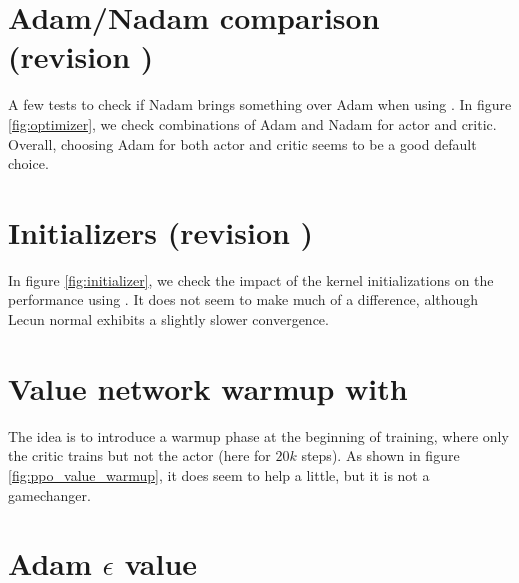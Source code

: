 \section{Adam/Nadam comparison (revision )}

A few tests to check if Nadam brings something over Adam when using \ppo. In figure \ref{fig:optimizer}, we check combinations of Adam and Nadam for actor and critic. Overall, choosing Adam for both actor and critic seems to be a good default choice.



\section{Initializers (revision )}

In figure \ref{fig:initializer}, we check the impact of the kernel initializations on the performance using \ppo. It does not seem to make much of a difference, although Lecun normal exhibits a slightly slower convergence.



\section{Value network warmup with \ppo}

The idea is to introduce a warmup phase at the beginning of training, where only the critic trains but not the actor (here for $20k$ steps). As shown in figure \ref{fig:ppo_value_warmup}, it does seem to help a little, but it is not a gamechanger.



\section{Adam $\epsilon$ value}

